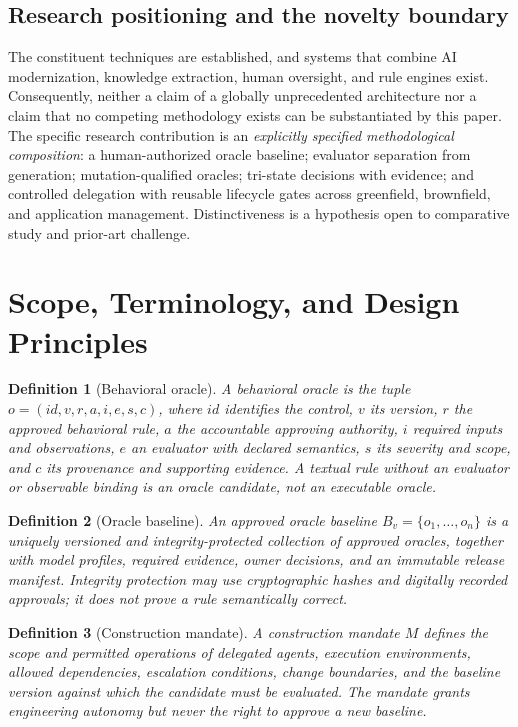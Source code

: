 \documentclass[11pt,a4paper]{article}
\newtheorem{definition}{Definition}
\begin{document}
\subsection{Research positioning and the novelty boundary}
The constituent techniques are established, and systems that combine AI modernization, knowledge extraction, human oversight, and rule engines exist. Consequently, neither a claim of a globally unprecedented architecture nor a claim that no competing methodology exists can be substantiated by this paper. The specific research contribution is an \emph{explicitly specified methodological composition}: a human-authorized oracle baseline; evaluator separation from generation; mutation-qualified oracles; tri-state decisions with evidence; and controlled delegation with reusable lifecycle gates across greenfield, brownfield, and application management. Distinctiveness is a hypothesis open to comparative study and prior-art challenge.

\section{Scope, Terminology, and Design Principles}
\begin{definition}[Behavioral oracle]
A behavioral oracle is the tuple $o=(id, v, r, a, i, e, s, c)$, where $id$ identifies the control, $v$ its version, $r$ the approved behavioral rule, $a$ the accountable approving authority, $i$ required inputs and observations, $e$ an evaluator with declared semantics, $s$ its severity and scope, and $c$ its provenance and supporting evidence. A textual rule without an evaluator or observable binding is an \emph{oracle candidate}, not an executable oracle.
\end{definition}
\begin{definition}[Oracle baseline]
An approved oracle baseline $B_v=\{o_1,\dots,o_n\}$ is a uniquely versioned and integrity-protected collection of approved oracles, together with model profiles, required evidence, owner decisions, and an immutable release manifest. Integrity protection may use cryptographic hashes and digitally recorded approvals; it does not prove a rule semantically correct.
\end{definition}
\begin{definition}[Construction mandate]
A construction mandate $M$ defines the scope and permitted operations of delegated agents, execution environments, allowed dependencies, escalation conditions, change boundaries, and the baseline version against which the candidate must be evaluated. The mandate grants engineering autonomy but never the right to approve a new baseline.
\end{definition}
\end{document}
